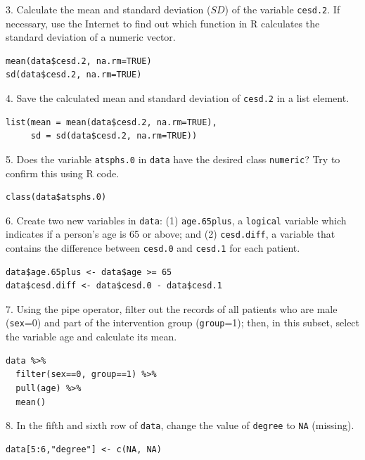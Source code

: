 3. Calculate the mean and standard deviation ($SD$) of the variable \texttt{cesd.2}. If necessary, use the Internet to find out which function in \textsf{R} calculates the standard deviation of a numeric vector.

\begin{lstlisting}
mean(data$cesd.2, na.rm=TRUE)
sd(data$cesd.2, na.rm=TRUE)
\end{lstlisting}

4. Save the calculated mean and standard deviation of \texttt{cesd.2} in a list element.

\begin{lstlisting}
list(mean = mean(data$cesd.2, na.rm=TRUE),
     sd = sd(data$cesd.2, na.rm=TRUE))
\end{lstlisting}

5. Does the variable \texttt{atsphs.0} in \texttt{data} have the desired class \texttt{numeric}? Try to confirm this using \textsf{R} code.

\begin{lstlisting}
class(data$atsphs.0)
\end{lstlisting}

6. Create two new variables in \texttt{data}: (1) \texttt{age.65plus}, a \texttt{logical} variable which indicates if a person's age is 65 or above; and (2) \texttt{cesd.diff}, a variable that contains the difference between \texttt{cesd.0} and \texttt{cesd.1} for each patient.

\begin{lstlisting}
data$age.65plus <- data$age >= 65
data$cesd.diff <- data$cesd.0 - data$cesd.1
\end{lstlisting}

7. Using the pipe operator, filter out the records of all patients who are male (\texttt{sex}=0) and part of the intervention group (\texttt{group}=1); then, in this subset, select the variable \textsf{age} and calculate its mean.

\begin{lstlisting}
data %>%
  filter(sex==0, group==1) %>%
  pull(age) %>%
  mean()
\end{lstlisting}

8. In the fifth and sixth row of \texttt{data}, change the value of \texttt{degree} to \texttt{NA} (missing).

\begin{lstlisting}
data[5:6,"degree"] <- c(NA, NA)
\end{lstlisting}

\clearpage
\newpage


